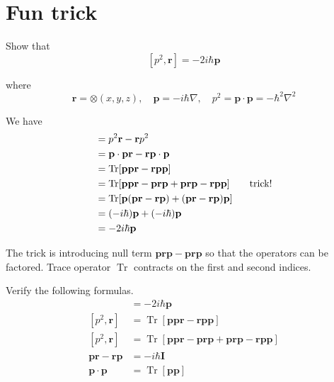 

\section*{Fun trick}

Show that
\begin{equation*}
\left[p^2,\mathbf r\right]=-2i\hbar\mathbf p
\end{equation*}

where
\begin{equation*}
\mathbf r=\otimes(x,y,z),\quad
\mathbf p=-i\hbar\nabla,\quad
p^2=\mathbf p\cdot\mathbf p=-\hbar^2\nabla^2
\end{equation*}

We have
\begin{align*}
[p^2,\mathbf r]
&=p^2\mathbf r-\mathbf rp^2
\\
&=\mathbf p\cdot\mathbf p\mathbf r-\mathbf r \mathbf p\cdot\mathbf p
\\
&=\operatorname{Tr}[\mathbf{ppr}-\mathbf{rpp}]
\\
&=\operatorname{Tr}[\mathbf p\mathbf p\mathbf r-\mathbf p\mathbf r\mathbf p
+\mathbf p\mathbf r\mathbf p-\mathbf r\mathbf p\mathbf p]
\tag*{\text{trick!}}
\\
&=\operatorname{Tr}[\mathbf p(\mathbf{pr}-\mathbf{rp})
+(\mathbf{pr}-\mathbf{rp})\mathbf p]
\\
&=(-i\hbar)\mathbf p+(-i\hbar)\mathbf p
\\
&=-2i\hbar\mathbf p
\end{align*}

The trick is introducing null term $\mathbf{prp}-\mathbf{prp}$
so that the operators can be factored.
Trace operator $\operatorname{Tr}$ contracts on the first and second indices.

\bigskip
Verify the following formulas.
\begin{align*}
[p^2,\mathbf r]
&=-2i\hbar\mathbf p
\tag{1}
\\[1ex]
[p^2,\mathbf r]
&=\operatorname{Tr}[\mathbf{ppr}-\mathbf{rpp}]
\tag{2}
\\[1ex]
[p^2,\mathbf r]
&=\operatorname{Tr}[\mathbf p\mathbf p\mathbf r-\mathbf p\mathbf r\mathbf p
+\mathbf p\mathbf r\mathbf p-\mathbf r\mathbf p\mathbf p]
\tag{3}
\\[1ex]
\mathbf p\mathbf r-\mathbf r\mathbf p&=-i\hbar\mathbf I
\tag{4}
\\[1ex]
\mathbf p\cdot\mathbf p&=\operatorname{Tr}[\mathbf p\mathbf p]
\tag{5}
\end{align*}


